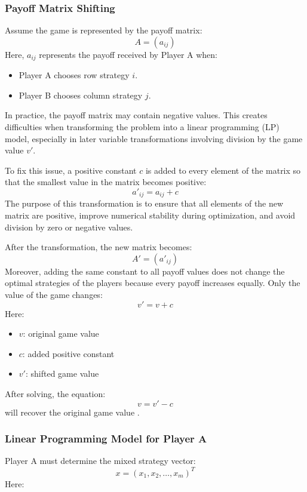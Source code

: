 \documentclass[12pt,a4paper]{article}
\begin{document}
\subsubsection{Payoff Matrix Shifting}

Assume the game is represented by the payoff matrix:
\[
A=(a_{ij})
\]
Here, \(a_{ij}\) represents the payoff received by Player A when:

\begin{itemize}
    \item Player A chooses row strategy \(i\).
    \item Player B chooses column strategy \(j\).
\end{itemize}




In practice, the payoff matrix may contain negative values. This creates difficulties when transforming the problem into a linear programming (LP) model, especially in later variable transformations involving division by the game value \(v'\).

To fix this issue, a positive constant \(c\) is added to every element of the matrix so that the smallest value in the matrix becomes positive:
\[
a'_{ij}=a_{ij}+c
\]
The purpose of this transformation is to ensure that all elements of the new matrix are positive, improve numerical stability during optimization, and avoid division by zero or negative values.

After the transformation, the new matrix becomes:
\[
A'=(a'_{ij})
\]
Moreover, adding the same constant to all payoff values does not change the optimal strategies of the players because every payoff increases equally. Only the value of the game changes:
\[
v'=v+c
\]
Here:

\begin{itemize}
    \item \(v\): original game value
    \item \(c\): added positive constant
    \item \(v'\): shifted game value
\end{itemize}

After solving, the equation: 
\[
v=v'-c
\]
will recover the original game value \cite{murthy2007}.
\subsubsection{Linear Programming Model for Player A}

Player A must determine the mixed strategy vector:
\[
x=(x_1,x_2,\dots,x_m)^T
\]
Here:
\end{document}
